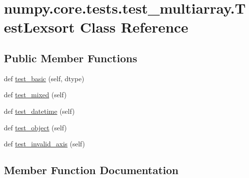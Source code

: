 \hypertarget{classnumpy_1_1core_1_1tests_1_1test__multiarray_1_1TestLexsort}{}\section{numpy.\+core.\+tests.\+test\+\_\+multiarray.\+Test\+Lexsort Class Reference}
\label{classnumpy_1_1core_1_1tests_1_1test__multiarray_1_1TestLexsort}
\subsection*{Public Member Functions}
\begin{DoxyCompactItemize}
\item 
def \hyperlink{classnumpy_1_1core_1_1tests_1_1test__multiarray_1_1TestLexsort_a5a59f664e161d8b2f8b3950aa4a158b1}{test\+\_\+basic} (self, dtype)
\item 
def \hyperlink{classnumpy_1_1core_1_1tests_1_1test__multiarray_1_1TestLexsort_afd5d01f5f1ea693c00a2bb4479b8378a}{test\+\_\+mixed} (self)
\item 
def \hyperlink{classnumpy_1_1core_1_1tests_1_1test__multiarray_1_1TestLexsort_aeb20d2171f8ea417ce2f382703b9920d}{test\+\_\+datetime} (self)
\item 
def \hyperlink{classnumpy_1_1core_1_1tests_1_1test__multiarray_1_1TestLexsort_a9fa296bec9e1c0d6871544239844a9a6}{test\+\_\+object} (self)
\item 
def \hyperlink{classnumpy_1_1core_1_1tests_1_1test__multiarray_1_1TestLexsort_a3a5a93d4e3a044017beb7ae6f6e259a7}{test\+\_\+invalid\+\_\+axis} (self)
\end{DoxyCompactItemize}


\subsection{Member Function Documentation}
\mbox{\label{classnumpy_1_1core_1_1tests_1_1test__multiarray_1_1TestLexsort_a5a59f664e161d8b2f8b3950aa4a158b1}} 

